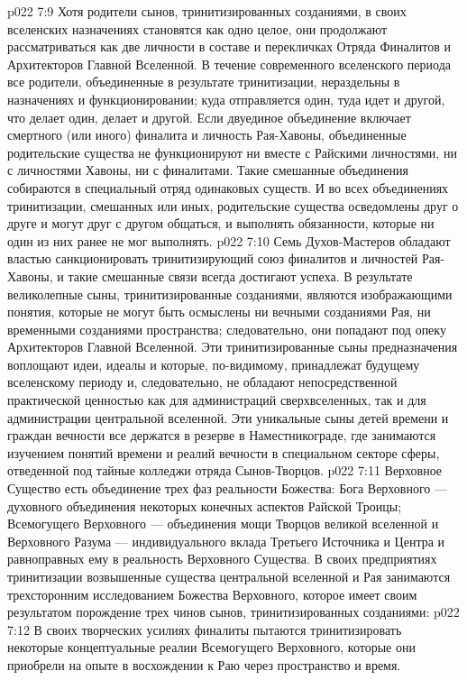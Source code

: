 \vs p022 7:9 Хотя родители сынов, тринитизированных созданиями, в своих вселенских назначениях становятся как одно целое, они продолжают рассматриваться как две личности в составе и перекличках Отряда Финалитов и Архитекторов Главной Вселенной. В течение современного вселенского периода все родители, объединенные в результате тринитизации, нераздельны в назначениях и функционировании; куда отправляется один, туда идет и другой, что делает один, делает и другой. Если двуединое объединение включает смертного (или иного) финалита и личность Рая\hyp{}Хавоны, объединенные родительские существа не функционируют ни вместе с Райскими личностями, ни с личностями Хавоны, ни с финалитами. Такие смешанные объединения собираются в специальный отряд одинаковых существ. И во всех объединениях тринитизации, смешанных или иных, родительские существа осведомлены друг о друге и могут друг с другом общаться, и выполнять обязанности, которые ни один из них ранее не мог выполнять.
\vs p022 7:10 \pc Семь Духов\hyp{}Мастеров обладают властью санкционировать тринитизирующий союз финалитов и личностей Рая\hyp{}Хавоны, и такие смешанные связи всегда достигают успеха. В результате великолепные сыны, тринитизированные созданиями, являются изображающими понятия, которые не могут быть осмыслены ни вечными созданиями Рая, ни временными созданиями пространства; следовательно, они попадают под опеку Архитекторов Главной Вселенной. Эти тринитизированные сыны предназначения воплощают идеи, идеалы и  которые, по\hyp{}видимому, принадлежат будущему вселенскому периоду и, следовательно, не обладают непосредственной практической ценностью как для администраций сверхвселенных, так и для администрации центральной вселенной. Эти уникальные сыны детей времени и граждан вечности все держатся в резерве в Наместникограде, где занимаются изучением понятий времени и реалий вечности в специальном секторе сферы, отведенной под тайные колледжи отряда Сынов\hyp{}Творцов.
\vs p022 7:11 \pc Верховное Существо есть объединение трех фаз реальности Божества: Бога Верховного --- духовного объединения некоторых конечных аспектов Райской Троицы; Всемогущего Верховного --- объединения мощи Творцов великой вселенной и Верховного Разума --- индивидуального вклада Третьего Источника и Центра и равноправных ему в реальность Верховного Существа. В своих предприятиях тринитизации возвышенные существа центральной вселенной и Рая занимаются трехсторонним исследованием Божества Верховного, которое имеет своим результатом порождение трех чинов сынов, тринитизированных созданиями:
\vs p022 7:12 \bibnobreakspace {} В своих творческих усилиях финалиты пытаются тринитизировать некоторые концептуальные реалии Всемогущего Верховного, которые они приобрели на опыте в восхождении к Раю через пространство и время.
